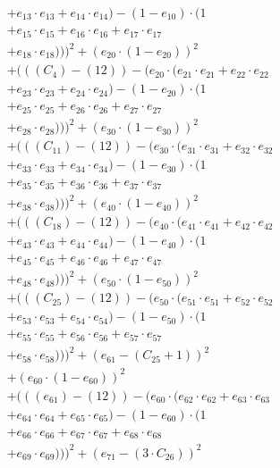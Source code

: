 \documentclass[10pt, a4paper]{article}
\begin{document}
\begin{align*}
& + e_{13} \cdot e_{13} + e_{14} \cdot e_{14}) - (1 - e_{10}) \cdot (1 \\
& + e_{15} \cdot e_{15} + e_{16} \cdot e_{16} + e_{17} \cdot e_{17} \\
& + e_{18} \cdot e_{18})))^{2} + (e_{20} \cdot (1 - e_{20}))^{2} \\
& + (((C_{4}) - (12)) - (e_{20} \cdot (e_{21} \cdot e_{21} + e_{22} \cdot e_{22} \\
& + e_{23} \cdot e_{23} + e_{24} \cdot e_{24}) - (1 - e_{20}) \cdot (1 \\
& + e_{25} \cdot e_{25} + e_{26} \cdot e_{26} + e_{27} \cdot e_{27} \\
& + e_{28} \cdot e_{28})))^{2} + (e_{30} \cdot (1 - e_{30}))^{2} \\
& + (((C_{11}) - (12)) - (e_{30} \cdot (e_{31} \cdot e_{31} + e_{32} \cdot e_{32} \\
& + e_{33} \cdot e_{33} + e_{34} \cdot e_{34}) - (1 - e_{30}) \cdot (1 \\
& + e_{35} \cdot e_{35} + e_{36} \cdot e_{36} + e_{37} \cdot e_{37} \\
& + e_{38} \cdot e_{38})))^{2} + (e_{40} \cdot (1 - e_{40}))^{2} \\
& + (((C_{18}) - (12)) - (e_{40} \cdot (e_{41} \cdot e_{41} + e_{42} \cdot e_{42} \\
& + e_{43} \cdot e_{43} + e_{44} \cdot e_{44}) - (1 - e_{40}) \cdot (1 \\
& + e_{45} \cdot e_{45} + e_{46} \cdot e_{46} + e_{47} \cdot e_{47} \\
& + e_{48} \cdot e_{48})))^{2} + (e_{50} \cdot (1 - e_{50}))^{2} \\
& + (((C_{25}) - (12)) - (e_{50} \cdot (e_{51} \cdot e_{51} + e_{52} \cdot e_{52} \\
& + e_{53} \cdot e_{53} + e_{54} \cdot e_{54}) - (1 - e_{50}) \cdot (1 \\
& + e_{55} \cdot e_{55} + e_{56} \cdot e_{56} + e_{57} \cdot e_{57} \\
& + e_{58} \cdot e_{58})))^{2} + (e_{61} - (C_{25} + 1))^{2} \\
& + (e_{60} \cdot (1 - e_{60}))^{2} \\
& + (((e_{61}) - (12)) - (e_{60} \cdot (e_{62} \cdot e_{62} + e_{63} \cdot e_{63} \\
& + e_{64} \cdot e_{64} + e_{65} \cdot e_{65}) - (1 - e_{60}) \cdot (1 \\
& + e_{66} \cdot e_{66} + e_{67} \cdot e_{67} + e_{68} \cdot e_{68} \\
& + e_{69} \cdot e_{69})))^{2} + (e_{71} - (3  \cdot  C_{26}))^{2} \\

\end{align*}
\end{document}
